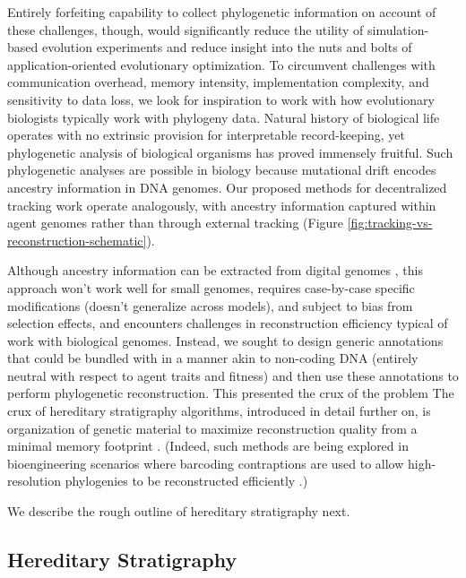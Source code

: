 Entirely forfeiting capability to collect phylogenetic information on account of these challenges, though, would significantly reduce the utility of simulation-based evolution experiments and reduce insight into the nuts and bolts of application-oriented evolutionary optimization.
To circumvent challenges with communication overhead, memory intensity, implementation complexity, and sensitivity to data loss, we look for inspiration to work with how evolutionary biologists typically work with phylogeny data.
Natural history of biological life operates with no extrinsic provision for interpretable record-keeping, yet phylogenetic analysis of biological organisms has proved immensely fruitful.
Such phylogenetic analyses are possible in biology because mutational drift encodes ancestry information in DNA genomes.
Our proposed methods for decentralized tracking work operate analogously, with ancestry information captured within agent genomes rather than through external tracking (Figure \ref{fig:tracking-vs-reconstruction-schematic}).

Although ancestry information can be extracted from digital genomes \citep{TODOOEE4}, this approach won't work well for small genomes, requires case-by-case specific modifications (doesn't generalize across models), and subject to bias from selection effects, and encounters challenges in reconstruction efficiency typical of work with biological genomes.
Instead, we sought to design generic annotations that could be bundled with in a manner akin to non-coding DNA (entirely neutral with respect to agent traits and fitness) and then use these annotations to perform phylogenetic reconstruction.
This presented the crux of the problem The crux of hereditary stratigraphy algorithms, introduced in detail further on, is organization of genetic material to maximize reconstruction quality from a minimal memory footprint \citep{moreno2022hereditary}.
(Indeed, such methods are being explored in bioengineering scenarios where barcoding contraptions are used to allow high-resolution phylogenies to be reconstructed efficiently \citep{TODO}.)

We describe the rough outline of hereditary stratigraphy next.

\subsection{Hereditary Stratigraphy}

